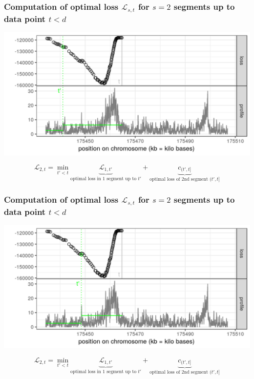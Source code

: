 
\begin{frame}
\frametitle{Computation of optimal loss $\mathcal L_{s, t}$
  for $s=2$ segments up to data point $t < d$}
  \includegraphics[width=\textwidth]{figure-dp-short-1.png}

$$
\mathcal L_{2, t} =
\min_{
  t' < t
}
\underbrace{
  \mathcal L_{1, t'}
}_{
  \text{optimal loss in 1 segment up to $t'$}
}
+
\underbrace{
  c_{(t', t]}
}_{
  \text{optimal loss of 2nd segment $(t', t]$}
}
$$

\end{frame}
 
\begin{frame}
\frametitle{Computation of optimal loss $\mathcal L_{s, t}$
  for $s=2$ segments up to data point $t < d$}
  \includegraphics[width=\textwidth]{figure-dp-short-2.png}

$$
\mathcal L_{2, t} =
\min_{
  t' < t
}
\underbrace{
  \mathcal L_{1, t'}
}_{
  \text{optimal loss in 1 segment up to $t'$}
}
+
\underbrace{
  c_{(t', t]}
}_{
  \text{optimal loss of 2nd segment $(t', t]$}
}
$$

\end{frame}
 
